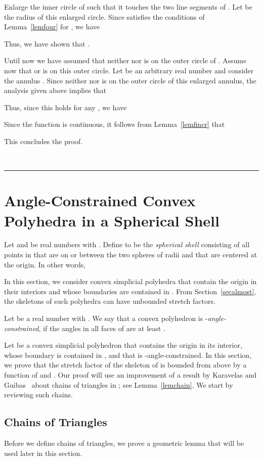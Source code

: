 \documentclass[12pt]{article}
\newcommand{\qed}{\rule{0.5em}{1.5ex}}
\newcommand{\fqed}{{\hfill~\qed}}
\newenvironment{proof}{{\noindent \bf Proof.}}
                      {{\hfill \fqed} \vspace{1em}}
\begin{document}
\begin{proof}
Enlarge the inner circle of  such that it touches the 
two line segments of . Let  be the radius of this enlarged 
circle. Since  satisfies the conditions of Lemma~\ref{lemfour}
for , we have  
 
Thus, we have shown that . 

\vspace{0.5em} 

Until now we have assumed that neither  nor  is on the outer 
circle of . Assume now that  or  is on this outer 
circle. Let  be an arbitrary real number and consider 
the annulus . Since neither  nor  is on 
the outer circle of this enlarged annulus, the analysis given above 
implies that 
 
Thus, since this holds for any , we have 
 
Since the function  is continuous, it follows from 
Lemma~\ref{lemfincr} that 
 
This concludes the proof. 
\end{proof} 


\section{Angle-Constrained Convex Polyhedra in a Spherical Shell} 
\label{secACSH} 

Let  and  be real numbers with . Define  
to be the \emph{spherical shell} consisting of all points in  
that are on or between the two spheres of radii  and  that are 
centered at the origin. In other words, 
 

In this section, we consider convex simplicial polyhedra that contain 
the origin in their interiors and whose boundaries are contained in 
. From Section~\ref{secalmost}, the skeletons of such 
polyhedra can have unbounded stretch factors. 

Let  be a real number with . We say that a 
convex polyhedron  is -\emph{angle-constrained}, if the 
angles in all faces of  are at least . 

Let  be a convex simplicial polyhedron that contains the origin in 
its interior, whose boundary is contained in , and that is 
-angle-constrained. In this section, we prove that the stretch 
factor of the skeleton of  is bounded from above by a function of 
 and . Our proof will use an improvement of a result by 
Karavelas and Guibas~\cite{kg-skgsa-01} about chains of triangles in 
; see Lemma~\ref{lemchain}. We start by reviewing such chains.  


\subsection{Chains of Triangles}  \label{secCoT} 
Before we define chains of triangles, we prove a geometric lemma that 
will be used later in this section. 
\end{document}
